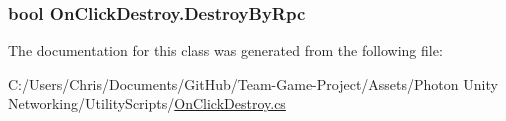 \subsubsection[{\texorpdfstring{Destroy\+By\+Rpc}{DestroyByRpc}}]{\setlength{\rightskip}{0pt plus 5cm}bool On\+Click\+Destroy.\+Destroy\+By\+Rpc}\hypertarget{class_on_click_destroy_ac2047f6e4afd9f42f366c09b7ffd7570}{}\label{class_on_click_destroy_ac2047f6e4afd9f42f366c09b7ffd7570}


The documentation for this class was generated from the following file\+:\begin{DoxyCompactItemize}
\item 
C\+:/\+Users/\+Chris/\+Documents/\+Git\+Hub/\+Team-\/\+Game-\/\+Project/\+Assets/\+Photon Unity Networking/\+Utility\+Scripts/\hyperlink{_on_click_destroy_8cs}{On\+Click\+Destroy.\+cs}\end{DoxyCompactItemize}
